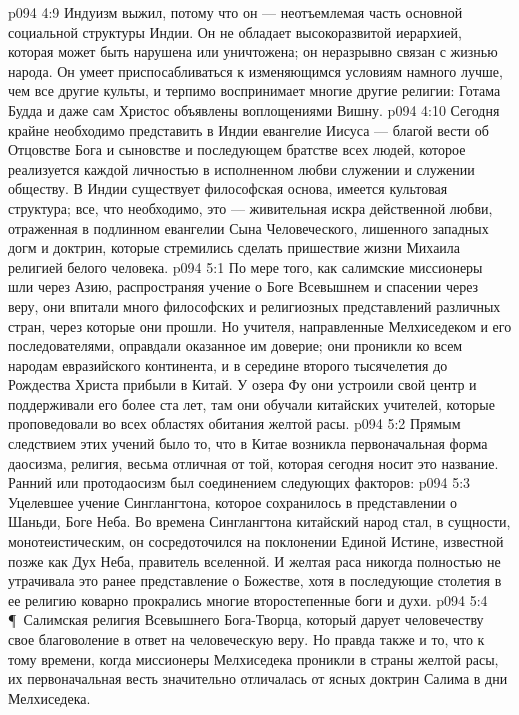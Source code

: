 \vs p094 4:9 Индуизм выжил, потому что он --- неотъемлемая часть основной социальной структуры Индии. Он не обладает высокоразвитой иерархией, которая может быть нарушена или уничтожена; он неразрывно связан с жизнью народа. Он умеет приспосабливаться к изменяющимся условиям намного лучше, чем все другие культы, и терпимо воспринимает многие другие религии: Готама Будда и даже сам Христос объявлены воплощениями Вишну.
\vs p094 4:10 Сегодня крайне необходимо представить в Индии евангелие Иисуса --- благой вести об Отцовстве Бога и сыновстве и последующем братстве всех людей, которое реализуется каждой личностью в исполненном любви служении и служении обществу. В Индии существует философская основа, имеется культовая структура; все, что необходимо, это --- живительная искра действенной любви, отраженная в подлинном евангелии Сына Человеческого, лишенного западных догм и доктрин, которые стремились сделать пришествие жизни Михаила религией белого человека.
\vs p094 5:1 По мере того, как салимские миссионеры шли через Азию, распространяя учение о Боге Всевышнем и спасении через веру, они впитали много философских и религиозных представлений различных стран, через которые они прошли. Но учителя, направленные Мелхиседеком и его последователями, оправдали оказанное им доверие; они проникли ко всем народам евразийского континента, и в середине второго тысячелетия до Рождества Христа прибыли в Китай. У озера Фу они устроили свой центр и поддерживали его более ста лет, там они обучали китайских учителей, которые проповедовали во всех областях обитания желтой расы.
\vs p094 5:2 Прямым следствием этих учений было то, что в Китае возникла первоначальная форма даосизма, религия, весьма отличная от той, которая сегодня носит это название. Ранний или протодаосизм был соединением следующих факторов:
\vs p094 5:3 \bibnobreakspace Уцелевшее учение Синглангтона, которое сохранилось в представлении о Шаньди, Боге Неба. Во времена Синглангтона китайский народ стал, в сущности, монотеистическим, он сосредоточился на поклонении Единой Истине, известной позже как Дух Неба, правитель вселенной. И желтая раса никогда полностью не утрачивала это ранее представление о Божестве, хотя в последующие столетия в ее религию коварно прокрались многие второстепенные боги и духи.
\vs p094 5:4 \P\ \bibnobreakspace Салимская религия Всевышнего Бога\hyp{}Творца, который дарует человечеству свое благоволение в ответ на человеческую веру. Но правда также и то, что к тому времени, когда миссионеры Мелхиседека проникли в страны желтой расы, их первоначальная весть значительно отличалась от ясных доктрин Салима в дни Мелхиседека.
